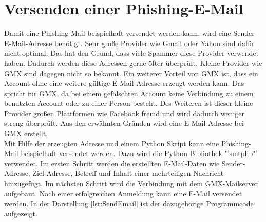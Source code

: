\section{Versenden einer Phishing-E-Mail}
Damit eine Phishing-Mail beispielhaft versendet werden kann, wird eine Sender-E-Mail-Adresse benötigt. Sehr große Provider wie Gmail oder Yahoo sind dafür nicht optimal. Das hat den Grund, dass viele Spammer diese Provider verwendet haben. Dadurch werden diese Adressen gerne öfter überprüft. Kleine Provider wie GMX sind dagegen nicht so bekannt. Ein weiterer Vorteil von GMX ist, dass ein Account ohne eine weitere gültige E-Mail-Adresse erzeugt werden kann. Das spricht für GMX, da bei einem gefälschten Account keine Verbindung zu einem benutzten Account oder zu einer Person besteht. Des Weiteren ist dieser kleine Provider großen Plattformen wie Facebook fremd und wird dadurch weniger streng überprüft.\cite{Bazzell} Aus den erwähnten Gründen wird eine E-Mail-Adresse bei GMX erstellt.\\
Mit Hilfe der erzeugten Adresse und einem Python Skript kann eine Phishing-Mail beispielhaft versendet werden. Dazu wird die Python Bibliothek "'smtplib"' verwendet. Im ersten Schritt werden die erstellten E-Mail-Daten wie Sender-Adresse, Ziel-Adresse, Betreff und Inhalt einer mehrteiligen Nachricht hinzugefügt. Im nächsten Schritt wird die Verbindung mit dem GMX-Mailserver aufgebaut. Nach einer erfolgreichen Anmeldung kann eine E-Mail versendet werden. In der Darstellung \ref{lst:SendEmail} ist der dazugehörige Programmcode aufgezeigt.










	